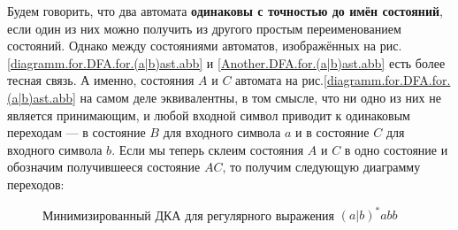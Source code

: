 \documentclass[10pt]{report}
\begin{document}
Будем говорить, что два автомата \textbf{одинаковы с точностью до имён состояний}, если один из них можно получить из другого простым переименованием состояний. Однако между
состояниями автоматов, изображённых на рис.\ref{diagramm.for.DFA.for.(a|b)ast.abb} и \ref{Another.DFA.for.(a|b)ast.abb} есть более тесная связь. А именно, состояния $A$ и $C$
автомата на рис.\ref{diagramm.for.DFA.for.(a|b)ast.abb} на самом деле эквивалентны, в том смысле, что ни одно из них не является принимающим, и любой входной символ приводит
к одинаковым переходам --- в состояние $B$ для входного символа $a$ и в состояние $C$ для входного символа $b$. Если мы теперь склеим состояния $A$ и $C$ в одно состояние и
обозначим получившееся состояние $AC$, то получим следующую диаграмму переходов:
\begin{figure}[!h]
\centering
{}
\caption{Минимизированный ДКА для регулярного выражения $(a|b)^*abb$}\label{diagramm.for.minimized.DFA.for.(a|b)ast.abb}
\end{figure}
\end{document}
